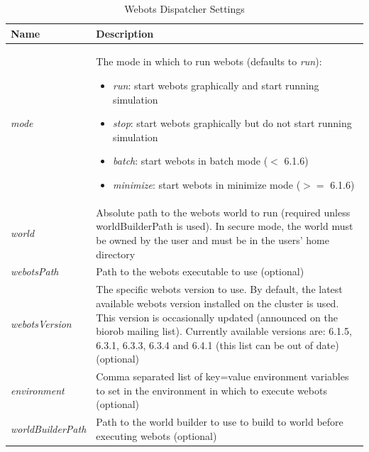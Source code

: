 \documentclass{report}
\begin{document}
\begin{table}[h!tb]\caption{Webots Dispatcher Settings}\label{tab:webots_settings}\vspace{0.1in}
	\centering

	\begin{tabular}{p{3cm} p{12cm}}
		\toprule
		\textbf{Name} & \textbf{Description} \\
		\midrule
		\textit{mode} & The mode in which to run webots (defaults to \textit{run}):
		\begin{itemize}
			\item \textit{run}: start webots graphically and start running simulation
			\item \textit{stop}: start webots graphically but do not start running simulation
			\item \textit{batch}: start webots in batch mode ($<$ 6.1.6)
			\item \textit{minimize}: start webots in minimize mode ($>=$ 6.1.6)
		\end{itemize} \\
		\textit{world} & Absolute path to the webots world to run (required
		                 unless worldBuilderPath is used). In secure mode, the
		                 world must be owned by the user and must be in
		the users' home directory \\
		\textit{webotsPath} & Path to the webots executable to use (optional) \\
		\textit{webotsVersion} & The specific webots version to use. By
		                         default, the latest available webots
		                         version installed on the cluster is
		                         used. This version is occasionally
		                         updated (announced on the biorob mailing
		                         list). Currently available versions are:
		                         6.1.5, 6.3.1, 6.3.3, 6.3.4 and 6.4.1
		                         (this list can be out of date) (optional) \\
		\textit{environment} & Comma separated list of key=value environment variables
		              to set in the environment in which to execute webots
		              (optional) \\
		\textit{worldBuilderPath} & Path to the world builder to use to build to world
		                   before executing webots (optional) \\
		\bottomrule
	\end{tabular}
\end{table}
\end{document}
